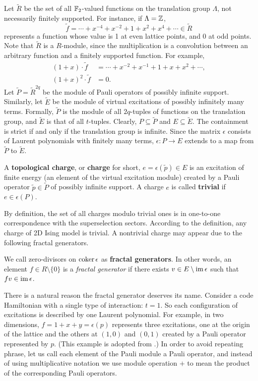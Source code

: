 Let $\tilde R$ be the set of all $\mathbb{F}_2$-valued functions on the translation group $\Lambda$,
not necessarily finitely supported. For instance, if $\Lambda = \mathbb{Z}$,
\[
\tilde f = \cdots + x^{-4} + x^{-2} + 1 + x^2 + x^4 + \cdots \in \tilde R
\]
represents a function whose value is 1 at even lattice points, and 0 at odd points.
Note that $\tilde R$ is a $R$-module,
since the multiplication is a convolution between an arbitrary function and a finitely supported function.
For example,
\begin{align*}
 (1+x) \cdot \tilde f &= \cdots + x^{-2} + x^{-1} + 1 + x + x^2 + \cdots , \\
 (1+x)^2 \cdot \tilde f &= 0 .
\end{align*}
Let $\tilde P = \tilde R^{2q}$ be the module of Pauli operators of possibly infinite support.
Similarly, let $\tilde E$ be the module of virtual excitations of possibly infinitely many terms.
Formally, $\tilde P$ is the module of all $2q$-tuples of functions on the translation group,
and $\tilde E$ is that of all $t$-tuples.
Clearly, $P \subseteq \tilde P$ and $E \subseteq \tilde E$.
The containment is strict if and only if the translation group is infinite.
Since the matrix $\epsilon$ consists of Laurent polynomials with finitely many terms,
$\epsilon:P \to E$ extends to a map from $\tilde P$ to $\tilde E$.
\begin{defn}
A {\bf topological charge}, or {\bf charge} for short, $e = \epsilon( \tilde p ) \in E$ 
is an excitation of finite energy (an element of the virtual excitation module)
created by a Pauli operator $\tilde p \in \tilde P$ of possibly infinite support.
A charge $e$ is called {\bf trivial} if $e \in \epsilon(P)$.
\end{defn}
\noindent By definition, the set of all charges modulo trivial ones is
in one-to-one correspondence with the superselection sectors.
According to the definition, any charge of 2D Ising model is trivial.
A nontrivial charge may appear due to the following fractal generators.
\begin{defn}
We call zero-divisors on $\mathop{\mathrm{coker}}\nolimits \epsilon$ as {\bf fractal generators}.
In other words, 
an element $f \in R \setminus \{0\}$ is a {\em fractal generator} if
there exists $v \in E \setminus \mathop{\mathrm{im}}\nolimits \epsilon$ 
such that $f v \in \mathop{\mathrm{im}}\nolimits \epsilon$.
\end{defn}

There is a natural reason the fractal generator deserves its name.
Consider a code Hamiltonian with a single type of interaction: $t=1$.
So each configuration of excitations is described by one Laurent polynomial.
For example, in two dimensions, $f = 1 + x + y = \epsilon (p)$ represents
three excitations, one at the origin of the lattice and the others at $(1,0)$ and $(0,1)$
created by a Pauli operator represented by $p$.
(This example is adopted from \cite{NewmanMoore1999Glassy}.)
In order to avoid repeating phrase,
let us call each element of the Pauli module a Pauli operator,
and instead of using multiplicative notation
we use module operation $+$ to mean the product of the corresponding Pauli operators.



